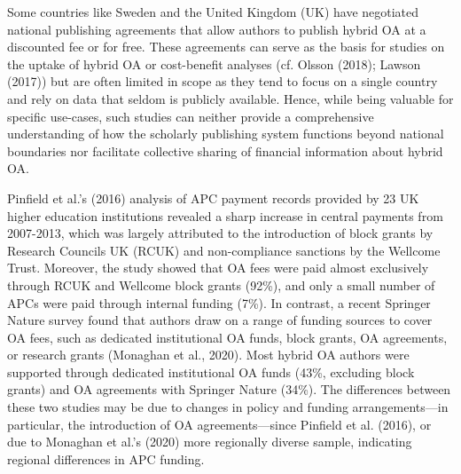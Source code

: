 \documentclass[a4paper,man,floatsintext,longtable,noextraspace,12pt]{apa6}
\begin{document}
Some countries like Sweden and the United Kingdom (UK) have negotiated
national publishing agreements that allow authors to publish hybrid OA
at a discounted fee or for free. These agreements can serve as the basis
for studies on the uptake of hybrid OA or cost-benefit analyses (cf.
Olsson (2018); Lawson (2017)) but are often limited in scope as they
tend to focus on a single country and rely on data that seldom is
publicly available. Hence, while being valuable for specific use-cases,
such studies can neither provide a comprehensive understanding of how
the scholarly publishing system functions beyond national boundaries nor
facilitate collective sharing of financial information about hybrid OA.

Pinfield et al.'s (2016) analysis of APC payment records provided by 23
UK higher education institutions revealed a sharp increase in central
payments from 2007-2013, which was largely attributed to the
introduction of block grants by Research Councils UK (RCUK) and
non-compliance sanctions by the Wellcome Trust. Moreover, the study
showed that OA fees were paid almost exclusively through RCUK and
Wellcome block grants (92\%), and only a small number of APCs were paid
through internal funding (7\%). In contrast, a recent Springer Nature
survey found that authors draw on a range of funding sources to cover OA
fees, such as dedicated institutional OA funds, block grants, OA
agreements, or research grants (Monaghan et al., 2020). Most hybrid OA
authors were supported through dedicated institutional OA funds (43\%,
excluding block grants) and OA agreements with Springer Nature (34\%).
The differences between these two studies may be due to changes in
policy and funding arrangements---in particular, the introduction of OA
agreements---since Pinfield et al. (2016), or due to Monaghan et al.'s
(2020) more regionally diverse sample, indicating regional differences
in APC funding.
\end{document}
